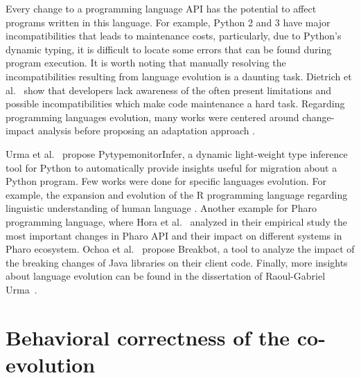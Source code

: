  Every change to a programming language API has the potential to affect programs written in this language. 
 For example, Python 2 and 3 have major incompatibilities that leads to maintenance costs, particularly, due to Python’s dynamic typing, it is difficult to locate some errors that can  be found during program execution.
 It is worth noting that manually resolving the incompatibilities resulting from language evolution is a daunting task.
Dietrich et al.~\cite{dietrich2016java} show that developers lack awareness of the 
 often present limitations and possible incompatibilities which make code maintenance a hard task.
Regarding programming languages evolution, many works were centered around change-impact analysis before proposing an adaptation approach \cite{arnold1996software,ren2004chianti,ryder2001change}.

 
 Urma et al.~\cite{urma2017programming} propose PytypemonitorInfer, a dynamic light-weight type inference tool for Python to automatically provide insights useful for migration about a Python program. Few works were done for specific languages evolution. For example, the expansion and evolution of the R programming language regarding linguistic understanding of human language \cite{urma2017programming}.
Another example for Pharo programming language, where Hora et al.~\cite{7332471} analyzed in their empirical study the most important changes in Pharo API and their impact on different systems in Pharo ecosystem.
Ochoa et al.~\cite{10.1145/3510455.3512783} propose Breakbot, a tool to analyze the impact of the breaking changes of Java libraries on their client code. Finally, more insights about language evolution can be found in the dissertation of Raoul-Gabriel Urma~\cite{urma2017programming}. 
	
 \section{Behavioral correctness of the co-evolution}
 \label{behavioralcorrectness}
 
 
 
 
 
 


